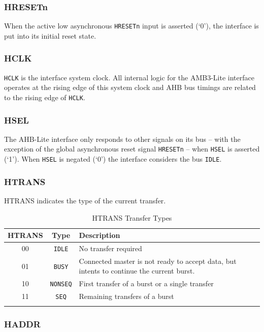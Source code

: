 \documentclass[]{article}
\begin{document}
\subsubsection{HRESETn}

When the active low asynchronous \texttt{HRESETn} input is asserted
(`0'), the interface is put into its initial reset state.

\subsubsection{HCLK}

\texttt{HCLK} is the interface system clock. All internal logic for the
AMB3-Lite interface operates at the rising edge of this system clock and
AHB bus timings are related to the rising edge of \texttt{HCLK}.

\subsubsection{HSEL}

The AHB-Lite interface only responds to other signals on its bus -- with
the exception of the global asynchronous reset signal \texttt{HRESETn}
-- when \texttt{HSEL} is asserted (`1'). When \texttt{HSEL} is negated
(`0') the interface considers the bus \texttt{IDLE}.

\subsubsection{HTRANS}

HTRANS indicates the type of the current transfer.

\begin{longtable}[]{@{}ccp{7cm}@{}}
\toprule
\textbf{HTRANS} & \textbf{Type} & \textbf{Description}\tabularnewline
\midrule
\endhead
00 & \texttt{IDLE} & No transfer required\tabularnewline
01 & \texttt{BUSY} & Connected master is not ready to accept data, but intents to continue the current burst.\tabularnewline
10 & \texttt{NONSEQ} & First transfer of a burst or a single transfer\tabularnewline
11 & \texttt{SEQ} & Remaining transfers of a burst\tabularnewline
\bottomrule
\caption{HTRANS Transfer Types}
\label{table:HTRANS}
\end{longtable}

\subsubsection{HADDR}
\end{document}
